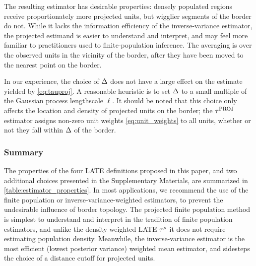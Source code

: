 The resulting estimator has desirable properties: densely populated regions receive proportionately more projected units, but wigglier segments of the border do not.
While it lacks the information efficiency of the inverse-variance estimator,
the projected estimand is easier to understand and interpret,
and may feel more familiar to practitioners used to finite-population inference.
The averaging is over the observed units in the vicinity of the border, after they have been moved to the nearest point on the border.

In our experience, the choice of \(\Delta\) does not have a large effect on the estimate yielded by \autoref{eq:tauproj}.
A reasonable heuristic is to set \(\Delta\) to a small multiple of the Gaussian process lengthscale \(\ell\).
It should be noted that this choice only affects the location and density of projected units on the border; the \(\tau^{\mathrm{PROJ}}\) estimator assigns non-zero unit weights \autoref{eq:unit_weights} to all units, whether or not they fall within \(\Delta\) of the border.

\subsubsection{Summary}
\label{sec:summary}

The properties of the four LATE definitions proposed in this paper, and two additional choices presented in the Supplementary Materials, are summarized in \autoref{table:estimator_properties}.
In most applications, we recommend the use of the finite population or inverse-variance-weighted estimators, to prevent the undesirable influence of border topology.
The projected finite population method is simplest to understand and interpret in the tradition of finite population estimators, and unlike the density weighted LATE \(\tau^{\rho}\) it does not require estimating population density.
Meanwhile, the inverse-variance estimator is the most efficient (lowest posterior variance) weighted mean estimator,
and sidesteps the choice of a distance cutoff for projected units.

